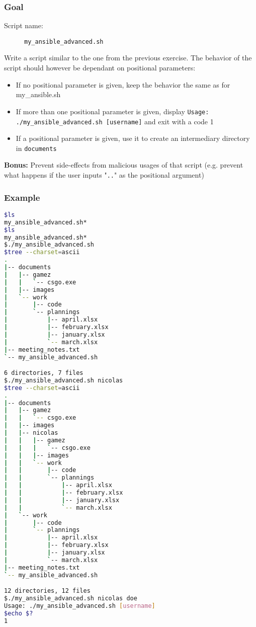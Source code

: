 \documentclass[12pt]{article}
\begin{document}
\subsubsection{Goal}

\begin{description}
    \item[Script name:] \texttt{my\_ansible\_advanced.sh}
\end{description}

Write a script similar to the one from the previous exercise. The behavior of the script should however be dependant on positional parameters:

\begin{itemize}
\item If no positional parameter is given, keep the behavior the same as for my\_ansible.sh
\item If more than one positional parameter is given, display \texttt{Usage: ./my\_ansible\_advanced.sh [username]} and exit with a code 1
\item If a positional parameter is given, use it to create an intermediary directory in \texttt{documents}
\end{itemize}

\textbf{Bonus:} Prevent side-effects from malicious usages of that script (e.g. prevent what happens if the user inputs "\texttt{..}" as the positional argument)

\subsubsection{Example}

\begin{lstlisting}[language=bash]
$ls
my_ansible_advanced.sh*
$ls
my_ansible_advanced.sh*
$./my_ansible_advanced.sh 
$tree --charset=ascii
.
|-- documents
|   |-- gamez
|   |   `-- csgo.exe
|   |-- images
|   `-- work
|       |-- code
|       `-- plannings
|           |-- april.xlsx
|           |-- february.xlsx
|           |-- january.xlsx
|           `-- march.xlsx
|-- meeting_notes.txt
`-- my_ansible_advanced.sh

6 directories, 7 files
$./my_ansible_advanced.sh nicolas
$tree --charset=ascii
.
|-- documents
|   |-- gamez
|   |   `-- csgo.exe
|   |-- images
|   |-- nicolas
|   |   |-- gamez
|   |   |   `-- csgo.exe
|   |   |-- images
|   |   `-- work
|   |       |-- code
|   |       `-- plannings
|   |           |-- april.xlsx
|   |           |-- february.xlsx
|   |           |-- january.xlsx
|   |           `-- march.xlsx
|   `-- work
|       |-- code
|       `-- plannings
|           |-- april.xlsx
|           |-- february.xlsx
|           |-- january.xlsx
|           `-- march.xlsx
|-- meeting_notes.txt
`-- my_ansible_advanced.sh

12 directories, 12 files
$./my_ansible_advanced.sh nicolas doe
Usage: ./my_ansible_advanced.sh [username]
$echo $?
1
\end{lstlisting}
\end{document}
